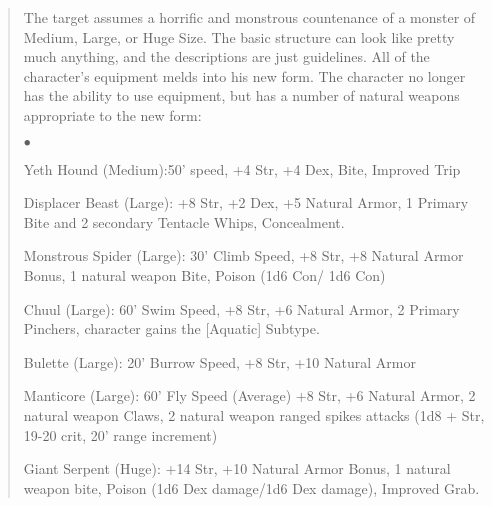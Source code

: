 \begin{quote}
\begin{small}
\end{small}

The target assumes a horrific and monstrous countenance of a monster of Medium, Large, or Huge Size. The basic structure can look like pretty much anything, and the descriptions are just guidelines. All of the character's equipment melds into his new form. The character no longer has the ability to use equipment, but has a number of natural weapons appropriate to the new form:

\begin{list}{$\bullet$}{\itemspace}
    \item Yeth Hound (Medium):50' speed, +4 Str, +4 Dex, Bite, Improved Trip
    \item Displacer Beast (Large): +8 Str, +2 Dex, +5 Natural Armor, 1 Primary Bite and 2 secondary Tentacle Whips, Concealment.
    \item Monstrous Spider (Large): 30' Climb Speed, +8 Str, +8 Natural Armor Bonus, 1 natural weapon Bite, Poison (1d6 Con/ 1d6 Con)
    \item Chuul (Large): 60' Swim Speed, +8 Str, +6 Natural Armor, 2 Primary Pinchers, character gains the [Aquatic] Subtype.
    \item Bulette (Large): 20' Burrow Speed, +8 Str, +10 Natural Armor
    \item Manticore (Large): 60' Fly Speed (Average) +8 Str, +6 Natural Armor, 2 natural weapon Claws, 2 natural weapon ranged spikes attacks (1d8 + Str, 19-20 crit, 20' range increment)
    \item Giant Serpent (Huge): +14 Str, +10 Natural Armor Bonus, 1 natural weapon bite, Poison (1d6 Dex damage/1d6 Dex damage), Improved Grab.
\end{list}
\end{quote}


